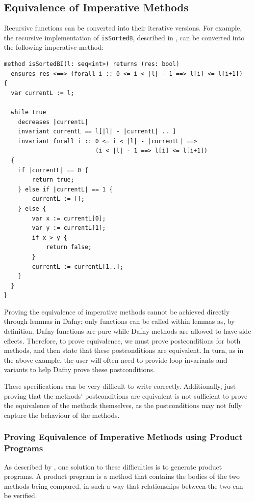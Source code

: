 \documentclass[a4paper, 11pt]{article}
\begin{document}
\subsection{Equivalence of Imperative Methods}

Recursive functions can be converted into their iterative versions. For example, the recursive implementation of \lstinline|isSortedB|, described in , can be converted into the following imperative method:
\begin{lstlisting}[caption=\lstinline|isSortedBI| Method]
method isSortedBI(l: seq<int>) returns (res: bool)
  ensures res <==> (forall i :: 0 <= i < |l| - 1 ==> l[i] <= l[i+1])
{
  var currentL := l;

  while true
    decreases |currentL|
    invariant currentL == l[|l| - |currentL| .. ]
    invariant forall i :: 0 <= i < |l| - |currentL| ==>
                          (i < |l| - 1 ==> l[i] <= l[i+1])
  {
    if |currentL| == 0 {
        return true;
    } else if |currentL| == 1 {
        currentL := [];
    } else {
        var x := currentL[0];
        var y := currentL[1];
        if x > y {
            return false;
        }
        currentL := currentL[1..];
    }
  }
}
\end{lstlisting}
%
Proving the equivalence of imperative methods cannot be achieved directly through lemmas in Dafny; only functions can be called within lemmas as, by definition, Dafny functions are pure while Dafny methods are allowed to have side effects. Therefore, to prove equivalence, we must prove postconditions for both methods, and then state that these postconditions are equivalent. In turn, as in the above example, the user will often need to provide loop invariants and variants to help Dafny prove these postconditions.

These specifications can be very difficult to write correctly. Additionally, just proving that the methods' postconditions are equivalent is not sufficient to prove the equivalence of the methods themselves, as the postconditions may not fully capture the behaviour of the methods. 

\subsubsection{Proving Equivalence of Imperative Methods using Product Programs}

As described by \textcite{lahiriDifferentialAssertionChecking2013}, one solution to these difficulties is to generate product programs. A product program is a method that contains the bodies of the two methods being compared, in such a way that relationships between the two can be verified.
\end{document}
